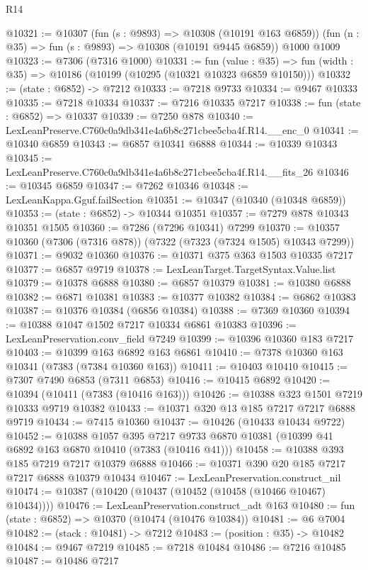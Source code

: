 \begin{lexlean}{R14}
\begin{coremodule}
@10321 := @10307
    (fun (s : @9893) => @10308 (@10191 @163 @6859))
    (fun (n : @35) => fun (s : @9893) => @10308 (@10191 @9445 @6859))
    @1000
    @1009
@10323 := @7306 (@7316 @1000)
@10331 := fun (value : @35) =>
  fun (width : @35) => @10186 (@10199 (@10295 (@10321 @10323 @6859 @10150)))
@10332 := (state : @6852) -> @7212
@10333 := @7218 @9733
@10334 := @9467 @10333
@10335 := @7218 @10334
@10337 := @7216 @10335 @7217
@10338 := fun (state : @6852) => @10337
@10339 := @7250 @878
@10340 := LexLeanPreserve.C760c0a9db341e4a6b8c271cbee5cba4f.R14.__enc_0
@10341 := @10340 @6859
@10343 := @6857 @10341 @6888
@10344 := @10339 @10343
@10345 := LexLeanPreserve.C760c0a9db341e4a6b8c271cbee5cba4f.R14.__fits_26
@10346 := @10345 @6859
@10347 := @7262 @10346
@10348 := LexLeanKappa.Gguf.failSection
@10351 := @10347 (@10340 (@10348 @6859))
@10353 := (state : @6852) -> @10344 @10351
@10357 := @7279 @878 @10343 @10351 @1505
@10360 := @7286 (@7296 @10341) @7299
@10370 := @10357 @10360 (@7306 (@7316 @878)) (@7322 (@7323 (@7324 @1505) @10343 @7299))
@10371 := @9032 @10360
@10376 := @10371 @375 @363 @1503 @10335 @7217
@10377 := @6857 @9719
@10378 := LexLeanTarget.TargetSyntax.Value.list
@10379 := @10378 @6888
@10380 := @6857 @10379
@10381 := @10380 @6888
@10382 := @6871 @10381
@10383 := @10377 @10382
@10384 := @6862 @10383
@10387 := @10376 @10384 (@6856 @10384)
@10388 := @7369 @10360
@10394 := @10388 @1047 @1502 @7217 @10334 @6861 @10383
@10396 := LexLeanPreservation.conv_field @7249
@10399 := @10396 @10360 @183 @7217
@10403 := @10399 @163 @6892 @163 @6861
@10410 := @7378 @10360 @163 @10341 (@7383 (@7384 @10360 @163))
@10411 := @10403 @10410
@10415 := @7307 @7490 @6853 (@7311 @6853)
@10416 := @10415 @6892
@10420 := @10394 (@10411 (@7383 (@10416 @163)))
@10426 := @10388 @323 @1501 @7219 @10333 @9719 @10382
@10433 := @10371 @320 @13 @185 @7217 @7217 @6888 @9719
@10434 := @7415 @10360
@10437 := @10426 (@10433 @10434 @9722)
@10452 := @10388
    @1057
    @395
    @7217
    @9733
    @6870
    @10381
    (@10399 @41 @6892 @163 @6870 @10410 (@7383 (@10416 @41)))
@10458 := @10388 @393 @185 @7219 @7217 @10379 @6888
@10466 := @10371 @390 @20 @185 @7217 @7217 @6888 @10379 @10434
@10467 := LexLeanPreservation.construct_nil
@10474 := @10387 (@10420 (@10437 (@10452 (@10458 (@10466 @10467) @10434))))
@10476 := LexLeanPreservation.construct_adt @163
@10480 := fun (state : @6852) => @10370 (@10474 (@10476 @10384))
@10481 := @6 @7004
@10482 := (stack : @10481) -> @7212
@10483 := (position : @35) -> @10482
@10484 := @9467 @7219
@10485 := @7218 @10484
@10486 := @7216 @10485
@10487 := @10486 @7217

\end{coremodule}
\end{lexlean}
